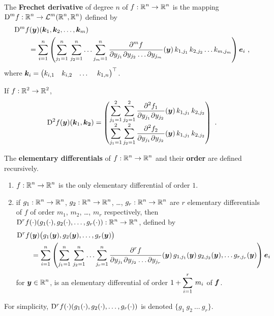 \begin{defn}
The {\bfseries Frechet derivative}
of degree $n$ of $\DS f:\RR^n \rightarrow \RR^n$ is the mapping
$\DS \fdiff{f}{m} : \RR^n \to \LL^{m}(\RR^n,\RR^n)$ defined by
\begin{align*}
&\fdiff{f}{m}(\VEC{y})(\VEC{k}_1,\VEC{k}_2,\ldots,\VEC{k}_m) \\
& \qquad = \sum_{i=1}^n \left( \sum_{j_1=1}^n \, \sum_{j_2=1}^n \ldots
\sum_{j_m=1}^n \pdydxdots{f}{y_{j_1}}{y_{j_2}}{y_{j_m}}{m}{}{}{}
(\VEC{y}) \, k_{1,j_1}\,k_{2,j_2}\ldots k_{m,j_m}  \right) \VEC{e}_i\ ,
\end{align*}
where $\DS \VEC{k}_i = \begin{pmatrix}
k_{i,1} & k_{i,2} & \ldots&\ k_{1,n} \end{pmatrix}^\top$.
\end{defn}

\begin{egg}
If $\DS f:\RR^2 \rightarrow \RR^2$,
\[
\fdiff{f}{2}(\VEC{y})(\VEC{k}_1, \VEC{k_2}) =
\begin{pmatrix}
\DS
\sum_{j_1=1}^2 \sum_{j_2=1}^2 \pdydxnm{f_1}{y_{j_1}}{y_{j_2}}{2}{}{}(\VEC{y})
\, k_{1,j_1}\,k_{2,j_2} \\[1em]
\DS
\sum_{j_1=1}^2 \sum_{j_2=1}^2 \pdydxnm{f_2}{y_{j_1}}{y_{j_2}}{2}{}{}(\VEC{y})
\, k_{1,j_1}\,k_{2,j_2}
\end{pmatrix} \ .
\]
\end{egg}

\begin{defn}
The
{\bfseries elementary differentials}
of $\DS f:\RR^n \rightarrow \RR^n$ and their
{\bfseries order}
are defined recursively.
\begin{enumerate}
\item $\DS f:\RR^n \rightarrow \RR^n$ is the only elementary
differential of order $1$.
\item if $\DS g_1:\RR^n\rightarrow \RR^n$,
$\DS g_2:\RR^n\rightarrow \RR^n$, \ldots,
$\DS g_r:\RR^n\rightarrow \RR^n$
are $r$ elementary differentials of $f$ of order $m_1$, $m_2$,
\ldots, $m_r$ respectively, then 
$\DS \fdiff{f}{r}(\cdot)(g_1(\cdot),g_2(\cdot), \ldots,g_r(\cdot))
:\RR^n\rightarrow \RR^n$,
defined by
\begin{align*}
&\fdiff{f}{r}(\VEC{y})\big(g_1(\VEC{y}),g_2(\VEC{y}),\ldots,g_r(\VEC{y})\big) \\
& \qquad = \sum_{i=1}^n \left( \sum_{j_1=1}^n \, \sum_{j_2=1}^n \ldots
\sum_{j_r=1}^n \pdydxdots{f}{y_{j_1}}{y_{j_2}}{y_{j_r}}{r}{}{}{}
(\VEC{y}) \, g_{1,j_1}(\VEC{y})\,g_{2,j_2}(\VEC{y}), \ldots
g_{r,j_r}(\VEC{y})  \right) \VEC{e}_i
\end{align*}
for $\DS \VEC{y} \in \RR^n$, is an elementary differential of order
$\DS 1 +\sum_{i=1}^r\,m_i$ of $\VEC{f}$.
\end{enumerate}
For simplicity, $\fdiff{f}{r}(\cdot)(g_1(\cdot),g_2(\cdot),\ldots,g_r(\cdot))$
is denoted $\{g_1\ g_2\ \ldots\ g_r\}$.
\end{defn}

